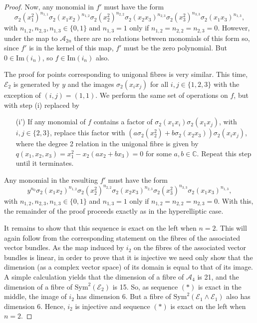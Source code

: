\documentclass{amsart}
\begin{document}
\begin{proof}
Now, any monomial in $f'$ must have the form
\[\sigma_2(x_1^2)^{n_{1,1}}\sigma_2(x_1x_2)^{n_{1,2}}\sigma_2(x_2^2)^{n_{2,2}}\sigma_2(x_2x_3)^{n_{2,3}}\sigma_2(x_3^2)^{n_{3,3}}\sigma_2(x_1x_3)^{n_{1,3}},\]
with $n_{1,2}, n_{2,3}, n_{1,3} \in \{0,1\}$ and $n_{1,3} = 1$ only if $n_{1,2} = n_{2,2} = n_{2,3} = 0$. However, under the map to ${\mathcal{A}}_{2n}$ there are no relations between monomials of this form so, since $f'$ is in the kernel of this map, $f'$ must be the zero polynomial. But $0 \in \mathrm{Im}(i_n)$, so $f \in \mathrm{Im}(i_n)$ also.

The proof for points corresponding to unigonal fibres is very similar. This time, ${\mathcal{E}}_2$ is generated by $y$ and the images $\sigma_2(x_ix_j)$ for all $i,j \in \{1,2,3\}$ with the exception of $(i,j) = (1,1)$. We perform the same set of operations on $f$, but with step (i) replaced by
\begin{enumerate}[(i)]
\item[(i')] If any monomial of $f$ contains a factor of $\sigma_2(x_1x_i)\sigma_2(x_1x_j)$, with $i,j \in \{2,3\}$, replace this factor with $(a\sigma_2(x_2^2) + b \sigma_2(x_2x_3))\sigma_2(x_ix_j)$, where the degree 2 relation in the unigonal fibre is given by $q(x_1,x_2,x_3) = x_1^2 - x_2(ax_2 + bx_3) = 0$ for some $a,b \in {\mathbb{C}}$. Repeat this step until it terminates.
\end{enumerate}
Any monomial in the resulting $f'$ must have the form
\[y^{n_{0}}\sigma_2(x_1x_2)^{n_{1,2}}\sigma_2(x_2^2)^{n_{2,2}}\sigma_2(x_2x_3)^{n_{2,3}}\sigma_2(x_3^2)^{n_{3,3}}\sigma_2(x_1x_3)^{n_{1,3}},\]
with $n_{1,2}, n_{2,3}, n_{1,3} \in \{0,1\}$ and $n_{1,3} = 1$ only if $n_{1,2} = n_{2,2} = n_{2,3} = 0$. With this, the remainder of the proof proceeds exactly as in the hyperelliptic case.

It remains to show that this sequence is exact on the left when $n = 2$. This will again follow from the corresponding statement on the fibres of the associated vector bundles. As the map induced by $i_2$ on the fibres of the associated vector bundles is linear, in order to prove that it is injective we need only show that the dimension (as a complex vector space) of its domain is equal to that of its image. A simple calculation yields that the dimension of a fibre of ${\mathcal{A}}_4$ is 21, and the dimension of a fibre of ${\mathrm{Sym}}^2({\mathcal{E}}_2)$ is 15. So, as sequence $(*)$ is exact in the middle, the image of $i_2$ has dimension 6. But a fibre of ${\mathrm{Sym}}^2({\mathcal{E}}_1 \wedge {\mathcal{E}}_1)$ also has dimension 6. Hence, $i_2$ is injective and sequence $(*)$ is exact on the left when $n = 2$. 


\end{proof}
\end{document}
